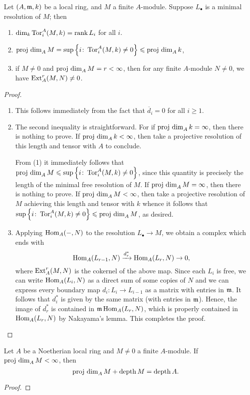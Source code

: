 \begin{lemma}
    Let $(A,\mathfrak{m}, k)$ be a local ring, and $M$ a finite $A$-module. Suppose $L_\bullet$ is a minimal resolution of $M$; then 
    \begin{enumerate}[label=(\arabic*)]
        \item $\dim_k\operatorname{Tor}^A_i(M, k) = \operatorname{rank} L_i$ for all $i$.
        \item $\operatorname{proj~dim}_A M = \sup\left\{i\colon\operatorname{Tor}^A_i(M, k)\ne 0\right\}\leqslant\operatorname{proj~dim}_A k$, 
        \item if $M\ne 0$ and $\operatorname{proj~dim}_A M = r < \infty$, then for any finite $A$-module $N\ne 0$, we have $\operatorname{Ext}^r_A(M, N)\ne 0$.
    \end{enumerate}
\end{lemma}
\begin{proof}
\begin{enumerate}[label=(\arabic*)]
    \item This follows immediately from the fact that $\overline d_i = 0$ for all $i\ge 1$.
    \item The second inequality is straightforward. For if $\operatorname{proj~dim}_A k = \infty$, then there is nothing to prove. If $\operatorname{proj~dim}_A k < \infty$, then take a projective resolution of this length and tensor with $A$ to conclude.
    
    From (1) it immediately follows that $\operatorname{proj~dim}_A M\leqslant\sup\left\{i\colon \operatorname{Tor}^A_i(M, k)\ne 0\right\}$, since this quantity is precisely the length of the minimal free resolution of $M$. If $\operatorname{proj~dim}_A M = \infty$, then there is nothing to prove. If $\operatorname{proj~dim}_A M < \infty$, then take a projective resolution of $M$ achieving this length and tensor with $k$ whence it follows that $\sup\left\{i\colon\operatorname{Tor}^A_i(M, k)\ne 0\right\}\leqslant\operatorname{proj~dim}_A M$, as desired.

    \item Applying $\operatorname{Hom}_A(-, N)$ to the resolution $L_\bullet\to M$, we obtain a complex which ends with 
    \begin{equation*}
        \operatorname{Hom}_A(L_{r - 1}, N)\xrightarrow{d_r^\ast}\operatorname{Hom}_A(L_r, N)\to 0,
    \end{equation*}
    where $\operatorname{Ext}^r_A(M, N)$ is the cokernel of the above map. Since each $L_i$ is free, we can write $\operatorname{Hom}_A(L_i, N)$ as a direct sum of some copies of $N$ and we can express every boundary map $d_i: L_i\to L_{i - 1}$ as a matrix with entries in $\mathfrak{m}$. It follows that $d_i^\ast$ is given by the same matrix (with entries in $\mathfrak{m}$). Hence, the image of $d_r^\ast$ is contained in $\mathfrak{m}\operatorname{Hom}_A(L_r, N)$, which is properly contained in $\operatorname{Hom}_A(L_r, N)$ by Nakayama's lemma. This completes the proof.\qedhere
\end{enumerate}
\end{proof}

\begin{theorem}
    Let $A$ be a Noetherian local ring and $M\ne 0$ a finite $A$-module. If $\operatorname{proj~dim}_A M < \infty$, then 
    \begin{equation*}
        \operatorname{proj~dim}_A M + \operatorname{depth} M = \operatorname{depth} A.
    \end{equation*}
\end{theorem}
\begin{proof}
    
\end{proof}